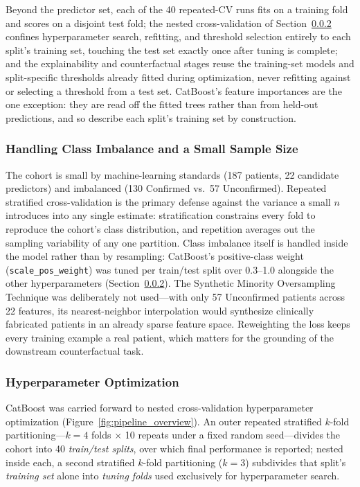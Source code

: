 \documentclass[pdflatex,sn-mathphys-num]{sn-jnl}%
\theoremstyle{thmstyleone}%
\theoremstyle{thmstyletwo}%
\theoremstyle{thmstylethree}%
\begin{document}
Beyond the predictor set, each of the 40 repeated-CV runs fits on a training fold and scores on a
disjoint test fold; the nested cross-validation of Section~\ref{sec:hpo} confines hyperparameter
search, refitting, and threshold selection entirely to each split's training set, touching the test
set exactly once after tuning is complete; and the explainability and counterfactual stages reuse
the training-set models and split-specific thresholds already fitted during optimization, never
refitting against or selecting a threshold from a test set. CatBoost's feature importances are the
one exception: they are read off the fitted trees rather than from held-out predictions, and so
describe each split's training set by construction.

\subsubsection{Handling Class Imbalance and a Small Sample Size}
\label{sec:classimbalance}

The cohort is small by machine-learning standards (187 patients, 22 candidate predictors) and
imbalanced (130 Confirmed vs.\ 57 Unconfirmed). Repeated stratified cross-validation is the primary
defense against the variance a small $n$ introduces into any single estimate: stratification
constrains every fold to reproduce the cohort's class distribution, and repetition averages out the
sampling variability of any one partition. Class imbalance itself is handled inside the model rather
than by resampling: CatBoost's positive-class weight (\texttt{scale\_pos\_weight}) was tuned per
train/test split over 0.3--1.0 alongside the other hyperparameters (Section~\ref{sec:hpo}). The
Synthetic Minority Oversampling Technique was deliberately not used---with only 57 Unconfirmed
patients across 22 features, its nearest-neighbor interpolation would synthesize clinically
fabricated patients in an already sparse feature space. Reweighting the loss keeps every training
example a real patient, which matters for the grounding of the downstream counterfactual task.

\subsubsection{Hyperparameter Optimization}
\label{sec:hpo}

CatBoost was carried forward to nested cross-validation hyperparameter optimization
(Figure~\ref{fig:pipeline_overview}). An outer repeated stratified $k$-fold partitioning---$k=4$
folds $\times$ 10 repeats under a fixed random seed---divides the cohort into 40 \textit{train/test
splits}, over which final performance is reported; nested inside each, a second stratified $k$-fold
partitioning ($k=3$) subdivides that split's \textit{training set} alone into \textit{tuning folds}
used exclusively for hyperparameter search.
\end{document}
